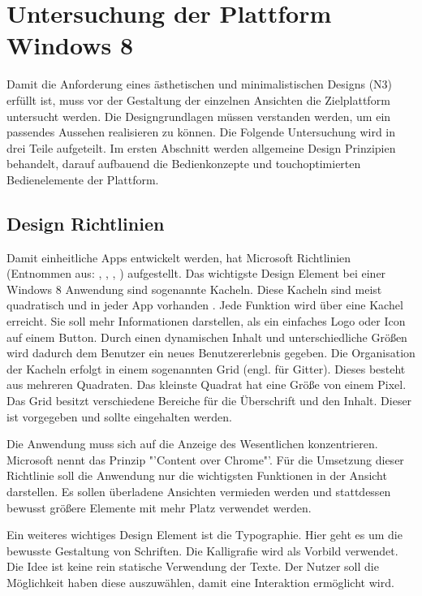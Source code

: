 \section{Untersuchung der Plattform Windows 8}
Damit die Anforderung eines ästhetischen und minimalistischen Designs (N3) erfüllt ist, muss vor der Gestaltung der einzelnen Ansichten die Zielplattform untersucht werden. Die Designgrundlagen müssen verstanden werden, um ein passendes Aussehen realisieren zu können. 
Die Folgende Untersuchung wird in drei Teile aufgeteilt. Im ersten Abschnitt werden allgemeine Design Prinzipien behandelt, darauf aufbauend die Bedienkonzepte und touchoptimierten Bedienelemente der Plattform.

\subsection{Design Richtlinien}
Damit einheitliche Apps entwickelt werden, hat Microsoft Richtlinien (Entnommen aus: \cite{bib:win80}, \cite{bib:win81}, \cite{bib:win82}, \cite{bib:win83}) aufgestellt.
Das wichtigste Design Element bei einer Windows 8 Anwendung sind sogenannte Kacheln. Diese Kacheln sind meist quadratisch und in jeder App vorhanden . Jede Funktion wird über eine Kachel erreicht. Sie soll mehr Informationen darstellen, als ein einfaches Logo oder Icon auf einem Button. Durch einen dynamischen Inhalt und unterschiedliche Größen wird dadurch dem Benutzer ein neues Benutzererlebnis gegeben. Die Organisation der Kacheln erfolgt in einem sogenannten Grid (engl. für Gitter). Dieses besteht aus mehreren Quadraten. Das kleinste Quadrat hat eine Größe von einem Pixel. Das Grid besitzt verschiedene Bereiche für die Überschrift und den Inhalt. Dieser ist vorgegeben und sollte eingehalten werden. \par 

Die Anwendung muss sich auf die Anzeige des Wesentlichen konzentrieren. Microsoft nennt  das Prinzip "'Content over Chrome"'.  Für die Umsetzung dieser Richtlinie soll die Anwendung nur die wichtigsten Funktionen in der Ansicht darstellen. Es sollen überladene Ansichten vermieden werden und stattdessen bewusst größere Elemente mit mehr Platz verwendet werden. 
 
Ein weiteres wichtiges Design Element ist die Typographie. Hier geht es um die bewusste Gestaltung von Schriften. Die Kalligrafie wird als Vorbild verwendet.  Die Idee ist keine rein statische Verwendung der Texte. Der Nutzer soll die Möglichkeit haben diese auszuwählen, damit eine Interaktion ermöglicht wird. 

